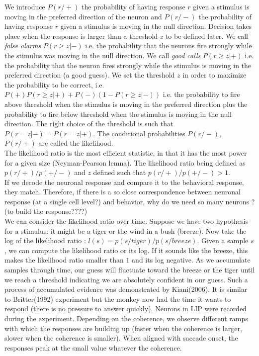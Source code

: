 \documentclass[10pt,a4paper]{article}
\begin{document}
We introduce $P(r / +)$ the probability of having response $r$ given a stimulus is moving in the preferred direction of the neuron and $P(r / -)$ the probability of having response $r$ given a stimulus is moving in the null direction. Decision takes place when the response is larger than a threshold $z$ to be defined later. We call \emph{false alarms} $P( r \geq z | -)$ i.e. the probability that the neurons fire strongly while the stimulus was moving in the null direction. We call \emph{good calls} $P(r \geq z | +)$ i.e. the probability that the neuron fires strongly while the stimulus is moving in the preferred direction (a good guess). We set the threshold $z$ in order to maximize the probability to be correct, i.e. $P(+) P(r \geq z | +) + P(-) ( 1 - P( r \geq z | -))$ i.e. the probability to fire above threshold when the stimulus is moving in the preferred direction plus the probability to fire below threshold when the stimulus is moving in the null direction. The right choice of the threshold is such that $P(r = z | -) = P(r = z | +)$. The conditional probabilities $P(r / -)$, $P(r / +)$ are called the likelihood. \\

The likelihood ratio is the most efficient statistic, in that it has the most power for a given size (Neyman-Pearson lemna). The likelihood ratio being defined as $p(r/+)/p(+/-)$ and $z$ defined such that $p(r/+)/p(+/-) > 1$.\\

If we decode the neuronal response and compare it to the behavioral response, they match. Therefore, if there is a so close correspondence between neuronal response (at a single cell level?) and behavior, why do we need so many neurons ? (to build the response????)\\

We can consider the likelihood ratio over time. Suppose we have two hypothesis for a stimulus: it might be a tiger or the wind in a bush (breeze). Now take the log of the likelihood ratio : $l(s) = p(s / tiger) / p(s / breeze)$. Given a sample $s$, we can compute the likelihood ratio or its log. If it sounds like the breeze, this makes the likelihood ratio smaller than $1$ and its log negative. As we accumulate samples through time, our guess will fluctuate toward the breeze or the tiger until we reach a threshold indicating we are absolutely confident in our guess. Such a process of accumulated evidence was demonstrated by Kiani(2006). It is similar to Britter(1992) experiment but the monkey now had the time it wants to respond (there is no pressure to answer quickly). Neurons in LIP were recorded during the experiment. Depending on the coherence, we observe different ramps with which the responses are building up (faster when the coherence is larger, slower when the coherence is smaller). When aligned with saccade onset, the responses peak at the small value whatever the coherence.\\
\end{document}
